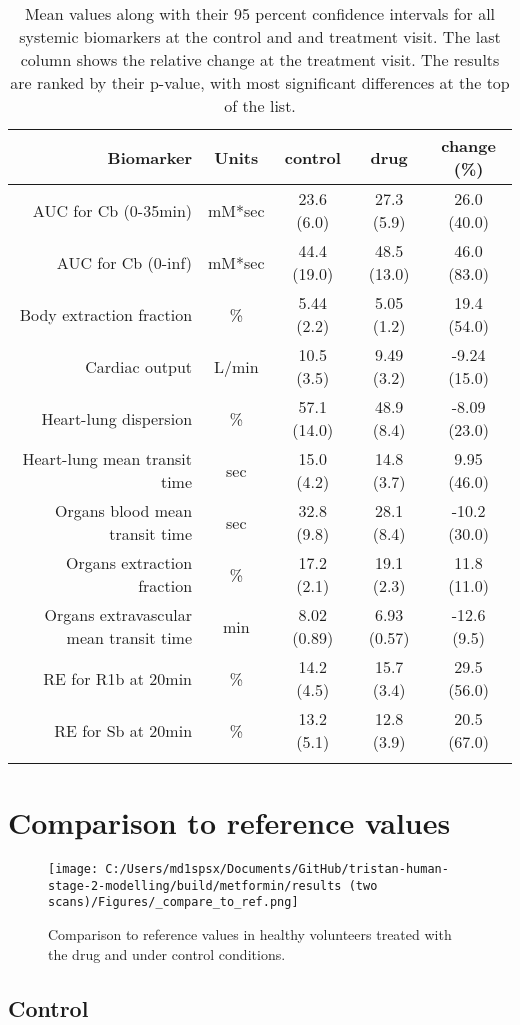 \documentclass{epflreport}%
\begin{document}
\begin{longtable}{rcccc}%
\hline%
Biomarker&Units&control&drug&change (\%)\\%
\hline%
AUC for Cb (0{-}35min)&mM*sec&23.6 (6.0) &27.3 (5.9) &26.0 (40.0) \\%
AUC for Cb (0{-}inf)&mM*sec&44.4 (19.0) &48.5 (13.0) &46.0 (83.0) \\%
Body extraction fraction&\%&5.44 (2.2) &5.05 (1.2) &19.4 (54.0) \\%
Cardiac output&L/min&10.5 (3.5) &9.49 (3.2) &{-}9.24 (15.0) \\%
Heart{-}lung dispersion&\%&57.1 (14.0) &48.9 (8.4) &{-}8.09 (23.0) \\%
Heart{-}lung mean transit time&sec&15.0 (4.2) &14.8 (3.7) &9.95 (46.0) \\%
Organs blood mean transit time&sec&32.8 (9.8) &28.1 (8.4) &{-}10.2 (30.0) \\%
Organs extraction fraction&\%&17.2 (2.1) &19.1 (2.3) &11.8 (11.0) \\%
Organs extravascular mean transit time&min&8.02 (0.89) &6.93 (0.57) &{-}12.6 (9.5) \\%
RE for R1b at 20min&\%&14.2 (4.5) &15.7 (3.4) &29.5 (56.0) \\%
RE for Sb at 20min&\%&13.2 (5.1) &12.8 (3.9) &20.5 (67.0) \\%
\hline%
\caption{Mean values along with their 95 percent confidence intervals for all systemic biomarkers at the control and and treatment visit. The last column shows the relative change at the treatment visit. The results are ranked by their p-value, with most significant differences at the top of the list.} \\%
\end{longtable}%
\clearpage%
\section{Comparison to reference values}%
\label{sec:Comparisontoreferencevalues}%

%


\begin{figure}[h!]%
\centering%
\texttt{[image: C:/Users/md1spsx/Documents/GitHub/tristan-human-stage-2-modelling/build/metformin/results (two scans)/Figures/\_compare\_to\_ref.png]}%
\caption{Comparison to reference values in healthy volunteers treated with the drug and under control conditions.}%
\end{figure}

%
\clearpage%
\subsection{Control}%
\label{subsec:Control}%
\end{document}
